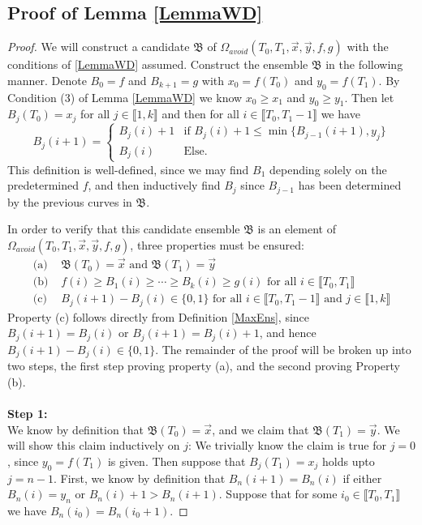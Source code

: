 \subsection{Proof of Lemma \ref{LemmaWD}}\label{LemmaWDProof}
	\begin{proof}
		We will construct a candidate $\mathfrak{B}$ of $\Omega_{avoid}(T_0,T_1,\vec x,\vec y, f,g)$ with the conditions of \ref{LemmaWD} assumed. Construct the ensemble $\mathfrak{B}$ in the following manner. Denote $B_0=f$ and $B_{k+1}=g$ with $x_0=f(T_0)$ and $y_0=f(T_1)$. By Condition (3) of Lemma \ref{LemmaWD} we know $x_0\geq x_1$ and $y_0\geq y_1$. Then let $B_j(T_0)=x_j$ for all $j\in \llbracket 1,k\rrbracket$ and then for all $i\in \llbracket T_0, T_{1}-1\rrbracket$ we have \begin{equation}\label{MaxEns}
		B_j(i+1)=\begin{cases}
		B_j(i)+1 & \text{if } B_j(i)+1\leq \min\{B_{j-1}(i+1),y_j\}\\
		B_j(i) &\text{Else.}
		\end{cases}
		\end{equation} This definition is well-defined, since we may find $B_1$ depending solely on the predetermined $f$, and then inductively find $B_j$ since $B_{j-1}$ has been determined by the previous curves in $\mathfrak{B}$.
		
		In order to verify that this candidate ensemble $\mathfrak{B}$ is an element of $\Omega_{avoid}(T_0,T_1,\vec x,\vec y,f,g)$, three properties must be ensured:
		\begin{equation}\label{nonEmpCond}
		\begin{split}
		\text{(a) } &\mathfrak{B}(T_0)=\vec x\text{ and }\mathfrak{B}(T_1)=\vec y\\
		\text{(b) } &f(i)\geq B_1(i)\geq \cdots \geq B_k(i)\geq g(i)\text{ for all }i\in \llbracket T_0,T_1\rrbracket\\
		\text{(c) } &B_{j}(i+1)-B_j(i)\in \{0,1\}\text{ for all }i\in \llbracket T_0,T_1-1\rrbracket\text{ and }j\in \llbracket 1,k\rrbracket
		\end{split}
		\end{equation} Property (c) follows directly from Definition \ref{MaxEns}, since $B_{j}(i+1)=B_j(i)$ or $B_{j}(i+1)=B_j(i)+1$, and hence $B_j(i+1)-B_j(i)\in \{0,1\}$. The remainder of the proof will be broken up into two steps, the first step proving property (a), and the second proving Property (b).\\\\
		\noindent\textbf{Step 1:}\\
		We know by definition that $\mathfrak{B}(T_0)=\vec x$, and we claim that $\mathfrak{B}(T_1)=\vec y$. We will show this claim inductively on $j$: We trivially know the claim is true for $j=0$, since $y_0=f(T_1)$ is given. Then suppose that $B_j(T_1)=x_j$ holds upto $j=n-1$. First, we know by definition that $B_{n}(i+1)=B_{n}(i)$ if either $B_{n}(i)=y_{n}$ or $B_{n}(i)+1>B_{n}(i+1)$.  Suppose that for some $i_0\in \llbracket{T_0,T_1}\rrbracket$ we have $B_n(i_0)=B_n(i_0+1)$.
		

\end{proof}
